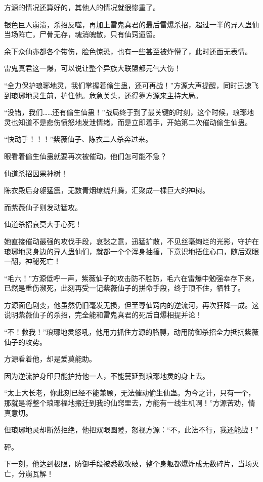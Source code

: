 \begin{this_body}
方源的情况还算好的，其他人的情况就很惨重了。

银色巨人崩溃，杀招反噬，再加上雷鬼真君的最后雷爆杀招，超过一半的异人蛊仙当场阵亡，尸骨无存，魂消魄散，只有仙窍遗留。

余下众仙亦都各个带伤，脸色惊恐，也有一些甚至被炸懵了，此时还面无表情。

雷鬼真君这一爆，可以说让整个异族大联盟都元气大伤！

“全力保护琅琊地灵，我们掌握着偷生蛊，还可再战！”方源大声提醒，同时迅速飞到琅琊地灵生前，护住他。危急关头，还得靠方源来主持大局。

“没错，我们……还有偷生仙蛊！”战局终于到了最关键的时刻，这个时候，琅琊地灵也知道不是悲伤愤怒地发泄情绪，而是立即着手，开始第二次催动偷生仙蛊。

“快动手！！！”紫薇仙子、陈衣二人杀奔过来。

眼看着偷生仙蛊就要再次被催动，他们怎可能不急？

仙道杀招因果神树！

陈衣殿后身躯猛震，无数青烟缭绕升腾，汇聚成一棵巨大的神树。

而紫薇仙子则发动猛攻。

仙道杀招哀莫大于心死！

她直接催动最强的攻伐手段，哀愁之意，迅猛扩散，不见丝毫绚烂的光影，守护在琅琊地灵身边的异人蛊仙们，就都一个个浑身抽搐，下意识地捂住心口，随后双眼一翻，神秘死亡！

“毛六！”方源低呼一声，紫薇仙子的攻击防不胜防，毛六在雷爆中勉强幸存下来，已然是重伤濒死，此刻再受一记紫薇仙子的拼命手段，终于顶不住，牺牲了。

方源面色剧变，他虽然仍旧毫发无损，但至尊仙窍内的逆流河，再次狂降一成。这说明紫薇仙子的杀招，完全能和雷鬼真君的死后自爆相提并论！

“不！救我！”琅琊地灵怒吼，他用力抓住方源的胳膊，动用防御杀招全力抵抗紫薇仙子的攻势。

方源看着他，却是爱莫能助。

因为逆流护身印只能护持他一人，不能蔓延到琅琊地灵的身上去。

“太上大长老，你此刻已经不能兼顾，无法催动偷生仙蛊。为今之计，只有一个，那就是将整个琅琊福地搬迁到我的仙窍里去，方能有一线生机啊！”方源苦劝，情真意切。

但琅琊地灵却断然拒绝，他把双眼圆瞪，怒视方源：“不，此法不行，我还能战！”

砰。

下一刻，他达到极限，防御手段被悉数攻破，整个身躯都爆炸成无数碎片，当场灭亡，分崩瓦解！


\end{this_body}
